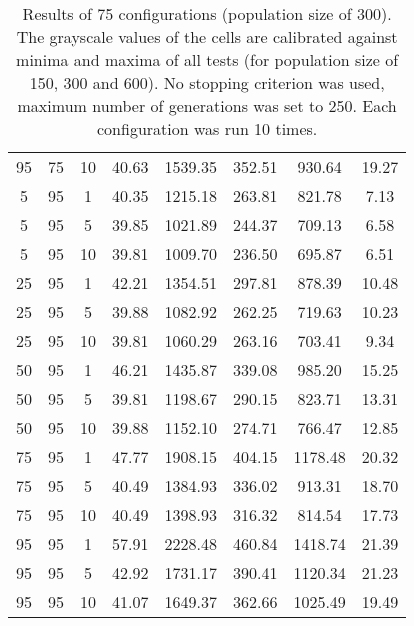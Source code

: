 \begin{table}[h]
\begin{tabular}{ccc|c|c|c|c|c}
95 & 75 & 10 & \cellcolor{gray!42}40.63 & \cellcolor{gray!1}1539.35 & \cellcolor{gray!1}352.51 & \cellcolor{gray!1}930.64 & 19.27\\
5 & 95 & 1 & \cellcolor{gray!45}40.35 & \cellcolor{gray!1}1215.18 & \cellcolor{gray!19}263.81 & \cellcolor{gray!5}821.78 & 7.13\\
5 & 95 & 5 & \cellcolor{gray!50}39.85 & \cellcolor{gray!33}1021.89 & \cellcolor{gray!41}244.37 & \cellcolor{gray!41}709.13 & 6.58\\
5 & 95 & 10 & \cellcolor{gray!50}39.81 & \cellcolor{gray!35}1009.70 & \cellcolor{gray!50}236.50 & \cellcolor{gray!45}695.87 & 6.51\\
25 & 95 & 1 & \cellcolor{gray!26}42.21 & \cellcolor{gray!1}1354.51 & \cellcolor{gray!1}297.81 & \cellcolor{gray!1}878.39 & 10.48\\
25 & 95 & 5 & \cellcolor{gray!50}39.88 & \cellcolor{gray!22}1082.92 & \cellcolor{gray!21}262.25 & \cellcolor{gray!37}719.63 & 10.23\\
25 & 95 & 10 & \cellcolor{gray!50}39.81 & \cellcolor{gray!26}1060.29 & \cellcolor{gray!20}263.16 & \cellcolor{gray!42}703.41 & 9.34\\
50 & 95 & 1 & \cellcolor{gray!1}46.21 & \cellcolor{gray!1}1435.87 & \cellcolor{gray!1}339.08 & \cellcolor{gray!1}985.20 & 15.25\\
50 & 95 & 5 & \cellcolor{gray!50}39.81 & \cellcolor{gray!1}1198.67 & \cellcolor{gray!1}290.15 & \cellcolor{gray!5}823.71 & 13.31\\
50 & 95 & 10 & \cellcolor{gray!50}39.88 & \cellcolor{gray!9}1152.10 & \cellcolor{gray!7}274.71 & \cellcolor{gray!23}766.47 & 12.85\\
75 & 95 & 1 & \cellcolor{gray!1}47.77 & \cellcolor{gray!1}1908.15 & \cellcolor{gray!1}404.15 & \cellcolor{gray!1}1178.48 & 20.32\\
75 & 95 & 5 & \cellcolor{gray!44}40.49 & \cellcolor{gray!1}1384.93 & \cellcolor{gray!1}336.02 & \cellcolor{gray!1}913.31 & 18.70\\
75 & 95 & 10 & \cellcolor{gray!44}40.49 & \cellcolor{gray!1}1398.93 & \cellcolor{gray!1}316.32 & \cellcolor{gray!8}814.54 & 17.73\\
95 & 95 & 1 & \cellcolor{gray!1}57.91 & \cellcolor{gray!1}2228.48 & \cellcolor{gray!1}460.84 & \cellcolor{gray!1}1418.74 & 21.39\\
95 & 95 & 5 & \cellcolor{gray!19}42.92 & \cellcolor{gray!1}1731.17 & \cellcolor{gray!1}390.41 & \cellcolor{gray!1}1120.34 & 21.23\\
95 & 95 & 10 & \cellcolor{gray!38}41.07 & \cellcolor{gray!1}1649.37 & \cellcolor{gray!1}362.66 & \cellcolor{gray!1}1025.49 & 19.49
\end{tabular}
\caption{Results of 75 configurations (population size of 300). The grayscale values of the cells are calibrated against minima and maxima of all tests (for population size of 150, 300 and 600). No stopping criterion was used, maximum number of generations was set to 250. Each configuration was run 10 times.}
\label{tab:res2}
\end{table}

